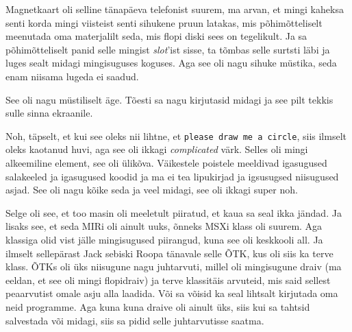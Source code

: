 
Magnetkaart oli selline  tänapäeva  telefonist suurem, ma arvan, et mingi kaheksa senti korda mingi viisteist senti sihukene pruun latakas, mis põhimõtteliselt meenutada oma materjalilt seda, mis flopi diski sees on tegelikult. Ja sa põhimõtteliselt panid selle mingist \emph{slot}'ist sisse, ta tõmbas selle surtsti läbi ja luges sealt midagi mingisuguses koguses. Aga see oli nagu sihuke müstika, seda enam niisama lugeda ei saadud. 


See oli nagu müstiliselt äge. Tõesti sa nagu kirjutasid midagi ja see pilt tekkis sulle  sinna ekraanile.


Noh, täpselt, et kui see oleks nii lihtne, et \verb|please draw me a circle|, siis  ilmselt oleks kaotanud huvi, aga see oli ikkagi \emph{complicated} värk. Selles oli mingi alkeemiline element, see oli ülikõva. Väikestele poistele meeldivad igasugused salakeeled ja igasugused koodid ja ma ei tea lipukirjad ja igsusugsed niisugused asjad. See  oli nagu kõike seda  ja veel midagi,  see oli ikkagi super noh.

Selge oli see, et too masin oli  meeletult piiratud, et kaua sa seal ikka jändad. Ja lisaks see, et seda MIRi oli ainult uuks, õnneks MSXi klass oli suurem. Aga klassiga olid vist jälle mingisugused piirangud, kuna see oli keskkooli all. Ja ilmselt sellepärast Jack sebiski Roopa tänavale selle ÕTK, kus oli siis ka terve klass. ÕTKs oli  üks niisugune nagu juhtarvuti, millel oli mingisugune draiv (ma eeldan, et see oli mingi flopidraiv) ja terve klassitäis arvuteid, mis said sellest peaarvutist omale asju alla laadida. Või sa võisid ka seal lihtsalt kirjutada oma neid programme. Aga kuna kuna draive oli ainult üks, siis kui sa tahtsid salvestada või midagi,  siis sa pidid selle juhtarvutisse saatma. 

